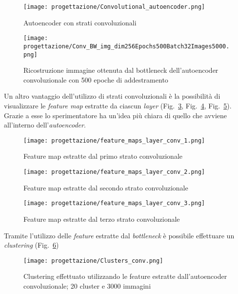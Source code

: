 \begin{figure}[!h] 
  \centering 
  \texttt{[image: progettazione/Convolutional\_autoencoder.png]} 
  \caption{Autoencoder con strati convoluzionali}
  \label{fig:schema-conv}
\end{figure}


\begin{figure}[!h] 
  \centering 
  \texttt{[image: progettazione/Conv\_BW\_img\_dim256Epochs500Batch32Images5000.png]} 
  \caption{Ricostruzione immagine ottenuta dal bottleneck dell'autoencoder convoluzionale con 500 epoche di addestramento}
  \label{fig:conv-ricostruita}
\end{figure}

Un altro vantaggio dell'utilizzo di strati convoluzionali è la possibilità di visualizzare le \emph{feature map} estratte da ciascun \emph{layer} (Fig.~\ref{fig:conv-1}, Fig.~\ref{fig:conv-2}, Fig.~\ref{fig:conv-3}). Grazie a esse lo sperimentatore ha un'idea più chiara di quello che avviene all'interno dell'\emph{autoencoder}.


\begin{figure}[!htbp] 
  \centering 
  \texttt{[image: progettazione/feature\_maps\_layer\_conv\_1.png]} 
  \caption{Feature map estratte dal primo strato convoluzionale}
  \label{fig:conv-1}
\end{figure}

\newpage

\begin{figure}[!htbp] 
  \centering 
  \texttt{[image: progettazione/feature\_maps\_layer\_conv\_2.png]} 
  \caption{Feature map estratte dal secondo strato convoluzionale}
  \label{fig:conv-2}
\end{figure}

\begin{figure}[!htbp] 
  \centering 
  \texttt{[image: progettazione/feature\_maps\_layer\_conv\_3.png]} 
  \caption{Feature map estratte dal terzo strato convoluzionale}
  \label{fig:conv-3}
\end{figure}

\newpage
Tramite l'utilizzo delle \emph{feature} estratte dal \emph{bottleneck} è possibile effettuare un \emph{clustering} (Fig.~\ref{fig:cluster-conv})


\begin{figure}[!htbp] 
  \centering 
  \texttt{[image: progettazione/Clusters\_conv.png]} 
  \caption{Clustering effettuato utilizzando le feature estratte dall'autoencoder convoluzionale; 20 cluster e 3000 immagini}
  \label{fig:cluster-conv}
\end{figure}

